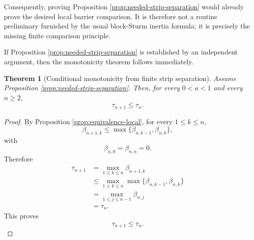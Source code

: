 \documentclass[11pt]{amsart}
\numberwithin{equation}{section}
\newtheorem{theorem}{Theorem}[section]
\begin{document}
Consequently, proving Proposition \ref{prop:needed-strip-separation} would
already prove the desired local barrier comparison.  It is therefore not a
routine preliminary furnished by the usual block-Sturm inertia formula; it is
precisely the missing finite comparison principle.

If Proposition \ref{prop:needed-strip-separation} is established by an
independent argument, then the monotonicity theorem follows immediately.

\begin{theorem}[Conditional monotonicity from finite strip separation]
Assume Proposition \ref{prop:needed-strip-separation}.  Then, for every
\(0<a<1\) and every \(n\ge2\),
\[
        \tau_{n+1}\le\tau_n.
\]
\end{theorem}

\begin{proof}
By Proposition \ref{prop:equivalence-local}, for every \(1\le k\le n\),
\[
        \beta_{n+1,k}
        \le
        \max\{\beta_{n,k-1},\beta_{n,k}\},
\]
with
\[
        \beta_{n,0}=\beta_{n,n}=0.
\]
Therefore
\[
\begin{aligned}
        \tau_{n+1}
        &=
        \max_{1\le k\le n}\beta_{n+1,k}                                      \\
        &\le
        \max_{1\le k\le n}
        \max\{\beta_{n,k-1},\beta_{n,k}\}                                    \\
        &=
        \max_{1\le j\le n-1}\beta_{n,j}                                      \\
        &=
        \tau_n.
\end{aligned}
\]
This proves
\[
        \tau_{n+1}\le\tau_n.
\]
\end{proof}
\end{document}
